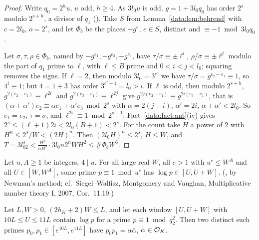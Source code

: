 \begin{proof}
Write $q_0 = 2^hu$, $u$ odd, $h \ge 4$. As $3l_0u$ is odd, $g = 1 + 3l_0q_0$ has order $2^s$
modulo $2^{s+h}$, a divisor of $q_1$ (). Take
$S$ from Lemma~\ref{data:lem:behrend} with $c = 2l_0$, $o = 2^s$, and let $\Phi_b$ be the places
$-g^e$, $e \in S$, distinct and $\equiv -1 \bmod 3l_0q_0$.

Let $\sigma, \tau, \rho \in \Phi_b$, named by $-g^{e_1}, -g^{e_2}, -g^{e_3}$, have
$\tau/\sigma \equiv \pm\ell^i$, $\rho/\sigma \equiv \pm\ell^j$ modulo the part of $q_1$ prime to
$\ell$, with $\ell \le B$ prime and $0 < i < j < l_0$; squaring removes the signs. If $\ell = 2$,
then modulo $3l_0 = 3^{c'}$ we have $\tau/\sigma = g^{e_2-e_1} \equiv 1$, so $4^i \equiv 1$; but
$4 = 1+3$ has order $3^{c'-1} = l_0 > i$. If $\ell$ is odd, then modulo $2^{s+h}$,
$g^{2(e_2-e_1)} \equiv \ell^{2i}$ and $g^{2(e_3-e_1)} \equiv \ell^{2j}$ give
$g^{2j(e_2-e_1)} \equiv g^{2i(e_3-e_1)}$, that is
$(\alpha+\alpha')e_2 \equiv \alpha e_1 + \alpha'e_3 \bmod 2^s$ with $\alpha = 2(j-i)$,
$\alpha' = 2i$, $\alpha + \alpha' < 2l_0$. So $e_1 = e_2$, $\tau = \sigma$, and
$\ell^{2i} \equiv 1 \bmod 2^{s+1}$; Fact~\ref{data:fact:ant}(iv) gives
$2^s \le (\ell+1)2i < 2l_0(B+1) < 2^s$. For the count take $H$ a power of $2$ with
$H^n \le 2^s/W < (2H)^n$. Then $(2l_0H)^n \le 2^s$, $H \le W$, and
$T = 3l_02^s < \frac{H^n}{nH^2}\cdot3l_0n2^nWH^2 \le \#\Phi_bW^6$.
\end{proof}

\begin{fact}\label{data:fact:primes}
Let $u, A \ge 1$ be integers, $4 \mid u$. For all large real $W$, all $e > 1$ with
$u^e \le W^A$ and all $U \in [W, W^A]$, some prime $p \equiv 1 \bmod u^e$ has
$\log p \in [U, U + W]$. (, by Newman's method; cf.\
Siegel--Walfisz, Montgomery and Vaughan, Multiplicative number theory I, 2007, Cor.~11.19.)
\end{fact}

\begin{lemma}\label{data:lem:pair}
Let $L, W > 0$, $(2h_K+2)W \le L$, and let each window $[U, U+W]$ with $10L \le U \le 11L$
contain $\log p$ for a prime $p \equiv 1 \bmod q_2^2$. Then two distinct such primes
$p_0, p_1 \in [e^{10L}, e^{11L}]$ have $p_0p_1 = \alpha\bar\alpha$, $\alpha \in \mathcal{O}_K$.
\end{lemma}

